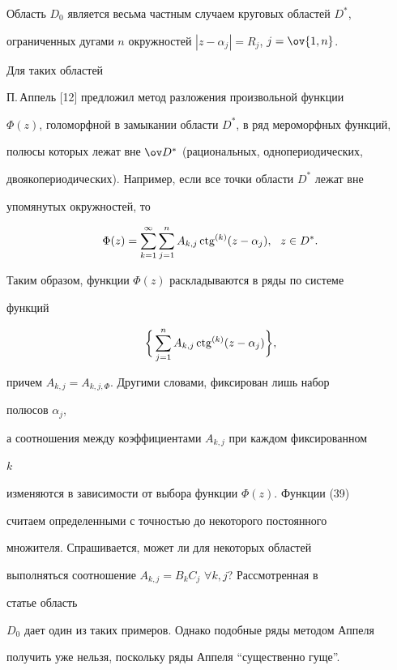  


Область $D_0$ является весьма частным случаем круговых областей $D^*$, 


ограниченных дугами $n$ окружностей $|z-\alpha_j|=R_j$, $j=\ov{1,n}$. 


Для таких областей  


П.\,Аппель [12] предложил метод разложения произвольной функции  


$\Phi(z)$, голоморфной в замыкании области $D^*$, в ряд мероморфных функций,  


полюсы которых лежат вне $\ov D{}^*$ (рациональных, однопериодических, 


двоякопериодических). Например, если все точки области $D^*$ лежат вне  


упомянутых окружностей, то 


$$ 


\Phi(z)=\sum^\infty_{k=1}\sum^n_{j=1}A_{k,j}\ctg^{(k)} 


(z-\alpha_j),\ \ z\in D^*. 


$$ 


Таким образом, функции $\Phi(z)$ раскладываются в ряды по системе  


функций 


\begin{equation} 


\bigg\{\sum^n_{j=1}A_{k,j}\ctg^{(k)}(z-\alpha_j)\bigg\}, 


\end{equation} 


причем $A_{k,j}=A_{k,j,\Phi}$. Другими словами, фиксирован лишь набор 


полюсов $\alpha_j$, 


а соотношения между коэффициентами $A_{k,j}$ при каждом фиксированном 


$k$ 


изменяются в зависимости от выбора функции $\Phi(z)$. Функции (39)  


считаем определенными с точностью до некоторого постоянного  


множителя. Спрашивается, может ли для некоторых областей  


выполняться соотношение $A_{k,j}=B_k C_j$ $\forall k,j$? Рассмотренная в 


статье область  


$D_0$ дает один из таких примеров. Однако подобные ряды методом Аппеля  


получить уже нельзя, поскольку ряды Аппеля ``существенно гуще''.  


